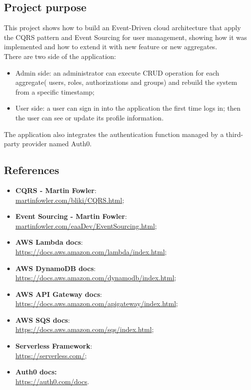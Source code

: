 \subsection{Project purpose}
This project shows how to build an Event-Driven cloud architecture that apply the CQRS pattern and Event Sourcing for user management, showing how it was implemented and how to extend it with new feature or new aggregates.\\
There are two side of the application:
\begin{itemize}
	\item Admin side: an administrator can execute CRUD operation for each aggregate( users, roles, authorizations and groups) and rebuild the system from a specific timestamp; 
	\item User side: a user can sign in into the application the first time logs in; then the user can see or update its profile information. 
\end{itemize}
The application also integrates the authentication function managed by a third-party provider named Auth0.

\subsection{References}
\begin{itemize}
	\item \textbf{CQRS - Martin Fowler}:\\ \url{martinfowler.com/bliki/CQRS.html};
	\item \textbf{Event Sourcing - Martin Fowler}:\\ \url{martinfowler.com/eaaDev/EventSourcing.html};
	\item \textbf{AWS Lambda docs}:\\ \url{https://docs.aws.amazon.com/lambda/index.html};
	\item \textbf{AWS DynamoDB docs}:\\ \url{https://docs.aws.amazon.com/dynamodb/index.html};
	\item \textbf{AWS API Gateway docs}:\\ \url{https://docs.aws.amazon.com/apigateway/index.html};
	\item \textbf{AWS SQS docs}:\\ \url{https://docs.aws.amazon.com/sqs/index.html};
	\item \textbf{Serverless Framework}:\\ \url{https://serverless.com/};
	\item \textbf{Auth0 docs:} \\ \url{https://auth0.com/docs}.
	
\end{itemize}
\pagebreak
